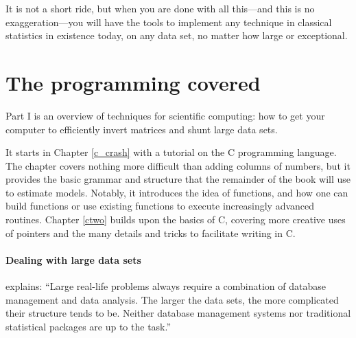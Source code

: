 It is not a short ride, but when you are done with all this---and this
is no exaggeration---you will have the tools to implement any technique
in classical statistics in existence today, on any data set, no matter
how large or exceptional.

\section{The programming covered}

Part I is an overview of techniques for scientific computing: how to get
your computer to efficiently invert matrices and shunt large data sets.

It starts in Chapter \ref{c_crash} with a tutorial on the C programming
language.  The chapter covers nothing more difficult than adding
columns of numbers, but it provides the basic grammar and structure that
the remainder of the book will use to estimate models. Notably,
it introduces the idea of functions, and how one can build functions or
use existing functions to execute increasingly advanced routines.
Chapter \ref{ctwo} builds upon the basics of C, covering more creative
uses of pointers and the many details and tricks to facilitate writing
in C.


\paragraph{Dealing with large data sets} 
\citet[p 619]{huber:languages} explains: ``Large real-life problems always require
a combination of database management and data analysis. The larger the
data sets, the more complicated their structure tends to be. Neither
database management systems nor traditional statistical packages are up
to the task.''

